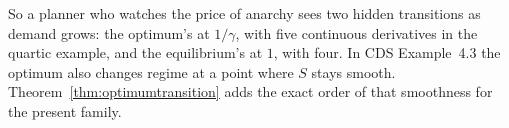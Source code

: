 So a planner who watches the price of anarchy sees two hidden transitions as demand grows: the optimum's at $1/\gamma$, with five continuous derivatives in the quartic example, and the equilibrium's at $1$, with four. In CDS Example~4.3 the optimum also changes regime at a point where $S$ stays smooth. Theorem~\ref{thm:optimumtransition} adds the exact order of that smoothness for the present family.
